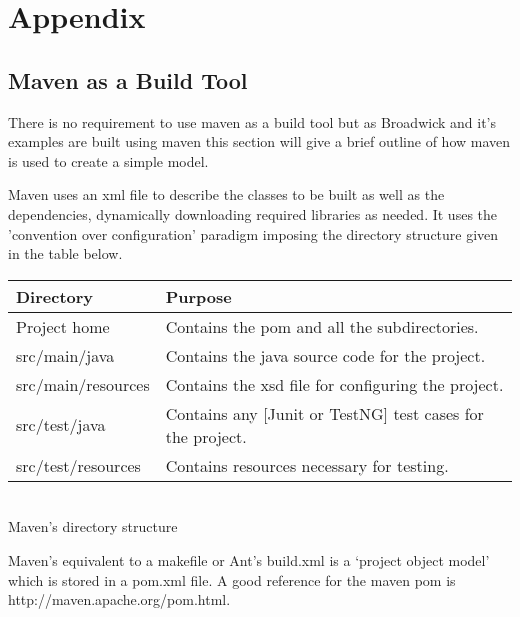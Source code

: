 \chapter*{Appendix}

\section*{Maven as a Build Tool}

There is no requirement to use maven as a build tool but as Broadwick and it's examples are built using maven this section will give a brief outline of how maven is used to create a simple model.

Maven uses an xml file to describe the classes to be built as well as the dependencies, dynamically downloading required libraries as needed. It uses the 'convention over configuration' paradigm imposing the directory structure given in the table below. 



\begin{table}[h]
\centering
\begin{tabulary}{\textwidth}{l l}
\toprule
\textbf{Directory} & \textbf{Purpose}\\
\midrule
Project home & Contains the pom and all the subdirectories. \\
src/main/java & Contains the java source code for the project. \\
src/main/resources & Contains the xsd file for configuring the project. \\
src/test/java & Contains any [Junit or TestNG] test cases for the project. \\
src/test/resources & Contains resources necessary for testing. \\
\bottomrule
\end{tabulary}
{\\Maven's directory structure}
\end{table}

Maven's equivalent to a makefile or Ant's build.xml is a `project object model' which is stored in a pom.xml file. A good reference for the maven pom is http://maven.apache.org/pom.html.
